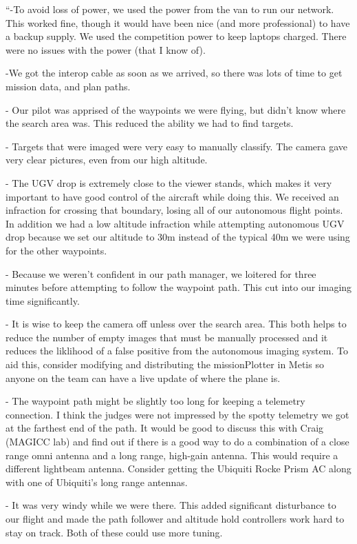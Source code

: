\documentclass[]{auvsi_doc}
\begin{document}
{``-To avoid loss of power, we used the power from the van to run our
network. This worked fine, though it would have been nice (and more
professional) to have a backup supply. We used the competition power to
keep laptops charged. There were no issues with the power (that I know
of).}

{-We got the interop cable as soon as we arrived, so there was lots of
time to get mission data, and plan paths.}

{- Our pilot was apprised of the waypoints we were flying, but didn't
know where the search area was. This reduced the ability we had to find
targets.}

{- Targets that were imaged were very easy to manually classify. The
camera gave very clear pictures, even from our high altitude.}

{- The UGV drop is extremely close to the viewer stands, which makes it
very important to have good control of the aircraft while doing this. We
received an infraction for crossing that boundary, losing all of our
autonomous flight points. In addition we had a low altitude infraction
while attempting autonomous UGV drop because we set our altitude to 30m
instead of the typical 40m we were using for the other waypoints. }

{- Because we weren't confident in our path manager, we loitered for
three minutes before attempting to follow the waypoint path. This cut
into our imaging time significantly.}

{- It is wise to keep the camera off unless over the search area. This
both helps to reduce the number of empty images that must be manually
processed and it reduces the liklihood of a false positive from the
autonomous imaging system. To aid this, consider modifying and
distributing the missionPlotter in Metis so anyone on the team can have
a live update of where the plane is.}

{- The waypoint path might be slightly too long for keeping a telemetry
connection. I think the judges were not impressed by the spotty
telemetry we got at the farthest end of the path. It would be good to
discuss this with Craig (MAGICC lab) and find out if there is a good way
to do a combination of a close range omni antenna and a long range,
high-gain antenna. This would require a different lightbeam antenna.
Consider getting the Ubiquiti Rocke Prism AC along with one of
Ubiquiti's long range antennas.}

{- It was very windy while we were there. This added significant
disturbance to our flight and made the path follower and altitude hold
controllers work hard to stay on track. Both of these could use more
tuning.}
\end{document}
